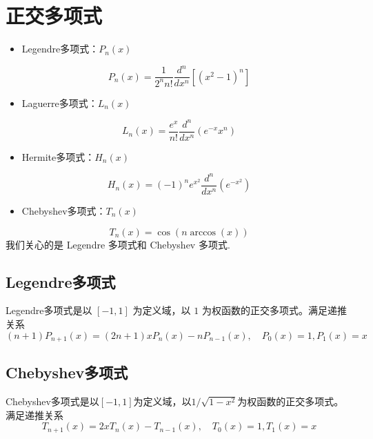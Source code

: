 \section{正交多项式}

\begin{itemize}
	\item Legendre多项式：$P_n(x)$
\end{itemize}
\[
P_n(x) = \frac{1}{2^n n!} \frac{d^n}{dx^n} \left[(x^2 - 1)^n\right]
\]
\begin{itemize}
	\item Laguerre多项式：$L_n(x)$
\end{itemize}
\[
L_n(x) = \frac{e^x}{n!} \frac{d^n}{dx^n} \left(e^{-x} x^n\right)
\]
\begin{itemize}
	\item Hermite多项式：$H_n(x)$
\end{itemize}
\[
H_n(x) = (-1)^n e^{x^2} \frac{d^n}{dx^n} \left(e^{-x^2}\right)
\]
\begin{itemize}
	\item Chebyshev多项式：$T_n(x)$
\end{itemize}
\[
T_n(x) = \cos(n \arccos(x))
\]
我们关心的是 Legendre 多项式和 Chebyshev 多项式.

\subsection{Legendre多项式}

Legendre多项式是以 $[-1,1]$ 为定义域，以 $1$ 为权函数的正交多项式。满足递推关系
\[
(n+1)P_{n+1}(x)=(2n+1)xP_n(x)-nP_{n-1}(x),\quad P_0(x)=1,P_1(x)=x
\]
\subsection{Chebyshev多项式}

Chebyshev多项式是以$[-1,1]$为定义域，以$1/\sqrt{1-x^2}$为权函数的正交多项式。满足递推关系
\[
T_{n+1}(x)=2xT_n(x)-T_{n-1}(x),\quad T_0(x)=1,T_1(x)=x
\]